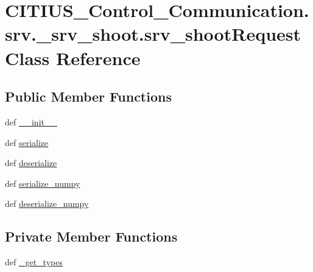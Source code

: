 \hypertarget{class_c_i_t_i_u_s___control___communication_1_1srv_1_1__srv__shoot_1_1srv__shoot_request}{\section{\-C\-I\-T\-I\-U\-S\-\_\-\-Control\-\_\-\-Communication.\-srv.\-\_\-srv\-\_\-shoot.\-srv\-\_\-shoot\-Request \-Class \-Reference}
\label{class_c_i_t_i_u_s___control___communication_1_1srv_1_1__srv__shoot_1_1srv__shoot_request}
}
\subsection*{\-Public \-Member \-Functions}
\begin{DoxyCompactItemize}
\item 
def \hyperlink{class_c_i_t_i_u_s___control___communication_1_1srv_1_1__srv__shoot_1_1srv__shoot_request_aa6912fe70017affa38927ec072b0ce1a}{\-\_\-\-\_\-init\-\_\-\-\_\-}
\item 
def \hyperlink{class_c_i_t_i_u_s___control___communication_1_1srv_1_1__srv__shoot_1_1srv__shoot_request_ace5156aad3d971bd57fb61a492b49919}{serialize}
\item 
def \hyperlink{class_c_i_t_i_u_s___control___communication_1_1srv_1_1__srv__shoot_1_1srv__shoot_request_a8bd03dd6a9c2efb6a7119e5fb82c52bf}{deserialize}
\item 
def \hyperlink{class_c_i_t_i_u_s___control___communication_1_1srv_1_1__srv__shoot_1_1srv__shoot_request_a5960aac3c39fd98b0a84ab1b386969a6}{serialize\-\_\-numpy}
\item 
def \hyperlink{class_c_i_t_i_u_s___control___communication_1_1srv_1_1__srv__shoot_1_1srv__shoot_request_a8f2c02bdda26cfb5589c7f9857df70e7}{deserialize\-\_\-numpy}
\end{DoxyCompactItemize}
\subsection*{\-Private \-Member \-Functions}
\begin{DoxyCompactItemize}
\item 
def \hyperlink{class_c_i_t_i_u_s___control___communication_1_1srv_1_1__srv__shoot_1_1srv__shoot_request_a605fa32a65d0d48825a40346bedeb3b1}{\-\_\-get\-\_\-types}
\end{DoxyCompactItemize}
